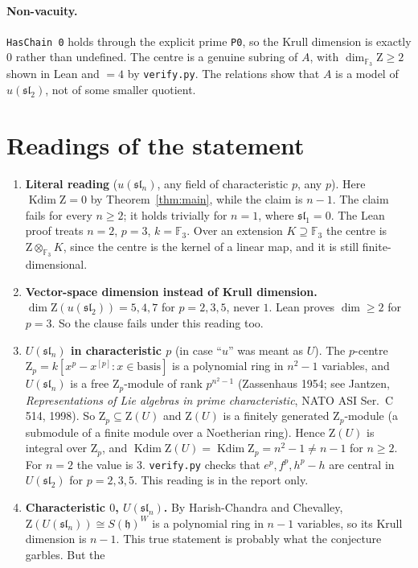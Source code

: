 \documentclass[11pt]{article}
\theoremstyle{definition}
\theoremstyle{remark}
\newcommand{\F}{\mathbb{F}}
\newcommand{\Z}{\mathrm{Z}}
\newcommand{\slt}{\mathfrak{sl}_2}
\newcommand{\sln}{\mathfrak{sl}_n}
\newcommand{\kdim}{\operatorname{Kdim}}
\begin{document}
\paragraph{Non-vacuity.} \texttt{HasChain 0} holds through the explicit prime \texttt{P0}, so the
Krull dimension is exactly $0$ rather than undefined. The centre is a genuine subring of $A$,
with $\dim_{\F_3}\Z\ge2$ shown in Lean and $=4$ by \texttt{verify.py}. The relations show that
$A$ is a model of $u(\slt)$, not of some smaller quotient.

\section{Readings of the statement}\label{sec:readings}
\begin{enumerate}
\item \textbf{Literal reading} ($u(\sln)$, any field of characteristic $p$, any $p$). Here
$\kdim\Z=0$ by Theorem~\ref{thm:main}, while the claim is $n-1$. The claim fails for every
$n\ge 2$; it holds trivially for $n=1$, where $\mathfrak{sl}_1=0$. The Lean proof treats $n=2$,
$p=3$, $k=\F_3$. Over an extension $K\supseteq\F_3$ the centre is $\Z\otimes_{\F_3}K$, since the
centre is the kernel of a linear map, and it is still finite-dimensional.
\item \textbf{Vector-space dimension instead of Krull dimension.} $\dim\Z(u(\slt))=5,4,7$ for
$p=2,3,5$, never $1$. Lean proves $\dim\ge2$ for $p=3$. So the clause fails under this reading
too.
\item \textbf{$U(\sln)$ in characteristic $p$} (in case ``$u$'' was meant as $U$). The $p$-centre
$\Z_p=k[x^p-x^{[p]}:x\in\text{basis}]$ is a polynomial ring in $n^2-1$ variables, and $U(\sln)$
is a free $\Z_p$-module of rank $p^{n^2-1}$ (Zassenhaus 1954; see Jantzen, \emph{Representations
of Lie algebras in prime characteristic}, NATO ASI Ser.~C 514, 1998). So $\Z_p\subseteq\Z(U)$ and
$\Z(U)$ is a finitely generated $\Z_p$-module (a submodule of a finite module over a Noetherian
ring). Hence $\Z(U)$ is integral over $\Z_p$, and $\kdim\Z(U)=\kdim\Z_p=n^2-1\neq n-1$ for
$n\ge2$. For $n=2$ the value is $3$. \texttt{verify.py} checks that $e^p,f^p,h^p-h$ are central in
$U(\slt)$ for $p=2,3,5$. This reading is in the report only.
\item \textbf{Characteristic $0$, $U(\sln)$.} By Harish-Chandra and Chevalley,
$\Z(U(\sln))\cong S(\mathfrak h)^{W}$ is a polynomial ring in $n-1$ variables, so its Krull
dimension is $n-1$. This true statement is probably what the conjecture garbles. But the

\end{enumerate}
\end{document}
